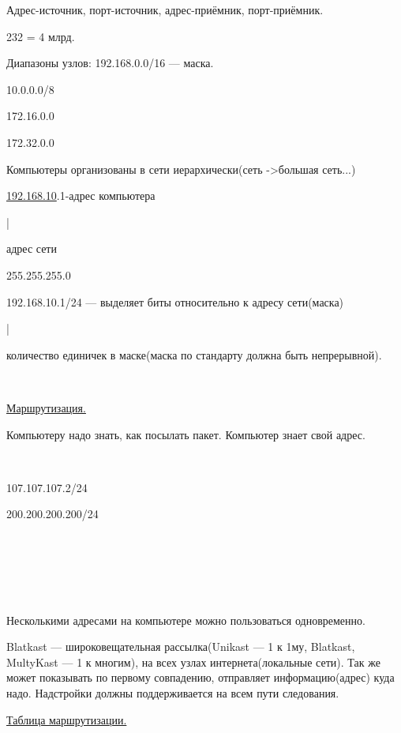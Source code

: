 \par 
Адрес-источник, порт-источник,
адрес-приёмник, порт-приёмник.
\par 232
= 4 млрд.
\par 
Диапазоны узлов: 192.168.0.0/16 — маска.
\par 
                               10.0.0.0/8
\par 
		         172.16.0.0
\par 
		         172.32.0.0
\par 
Компьютеры организованы в сети
иерархически(сеть ->большая сеть...)
\par \underline{192.168.10}.1-адрес
компьютера
\par 
     |
\par 
адрес сети
\par 
255.255.255.0
\par 
192.168.10.1/24 — выделяет биты
относительно к адресу сети(маска)
\par 
                       |
\par 
количество единичек в маске(маска
по стандарту должна быть непрерывной).
\par 
\\

\par 
\underline{Маршрутизация.}
\par 
Компьютеру надо знать, как
посылать пакет. Компьютер знает свой
адрес.
\par 
\\

\par 
107.107.107.2/24
                                                                     
                           200.200.200.200/24
\par 
\\

\par 
\\

\par 
\\

\par 
Несколькими адресами на компьютере
можно пользоваться одновременно.
\par 
Blatkast — широковещательная
рассылка(Unikast — 1 к 1му, Blatkast, MultyKast — 1 к
многим), на всех узлах интернета(локальные
сети). Так же может показывать по первому
совпадению, отправляет информацию(адрес)
куда надо. Надстройки должны поддерживается
на всем пути следования.
\par 
\underline{Таблица маршрутизации.}

